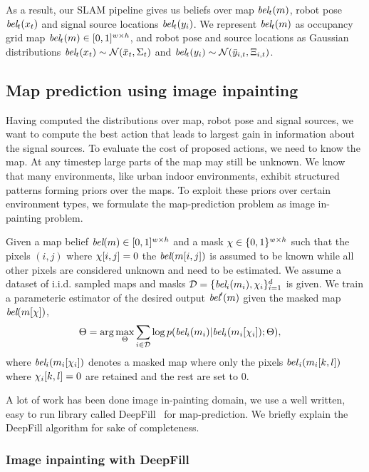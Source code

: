 As a result, our SLAM pipeline gives us beliefs over map $\textit{bel}_t(m)$, robot
pose $\textit{bel}_t(x_t)$ and signal source locations $\textit{bel}_t(y_i)$. We
represent $\textit{bel}_t(m)$ as occupancy grid map $\textit{bel}_t(m) \in [0,1]^{w \times
  h}$,
and robot pose and source locations as Gaussian distributions $\textit{bel}_t(x_t)
\sim \mathcal{N}(\bar{x}_t, \Sigma_t)$ and $\textit{bel}_t(y_i) \sim \mathcal{N}(\bar{y}_{i,t}, \Xi_{i,t})$.


\subsection{Map prediction using image inpainting}

Having computed the distributions over map, robot pose and signal sources, we
want to compute the best action that leads to largest gain in information about
the signal sources.
To evaluate the cost of proposed actions, we need to know the map.
At any timestep large parts of the map may still be unknown.
We know that many environments, like urban indoor environments, exhibit
structured patterns forming priors over the maps.
To exploit these priors over certain environment types, we formulate the
map-prediction problem as image in-painting problem.
%
\begin{problem}
Given a map belief $\textit{bel}(m) \in [0, 1]^{w \times h}$ and a mask $\chi \in
\{0, 1\}^{w \times h}$ such that the pixels $(i,j)$ where $\chi[i, j] = 0$ the
$\textit{bel}(m[i, j])$ is assumed to be known while all other pixels are considered
unknown and need to be estimated. We assume a dataset of i.i.d. sampled maps and
masks $\mathcal{D} = \{\textit{bel}_i(m_i), \chi_i\}_{i=1}^d$ is given. We train a
parameteric estimator of the desired output $\textit{bel}'(m)$ given the masked map $\textit{bel}(m[\chi])$,
%
\begin{align}
  \Theta &= \arg\max_{\Theta} \sum_{i \in \mathcal{D}} \log p (\textit{bel}_i(m_i)| \textit{bel}_i(m_i[\chi_i]); \Theta),
\end{align}%
% 
where $\textit{bel}_i(m_i[\chi_i])$ denotes a masked map where only the pixels
$bel_i(m_i[k,l])$ where $\chi_i[k,l] = 0$ are retained and the rest are set
to 0.
\end{problem}

A lot of work has been done image in-painting domain, we use a well written,
easy to run library called DeepFill~\cite{yu2018DeepFill} for map-prediction.
We briefly explain the DeepFill algorithm for sake of completeness.

\subsubsection{Image inpainting with DeepFill}

